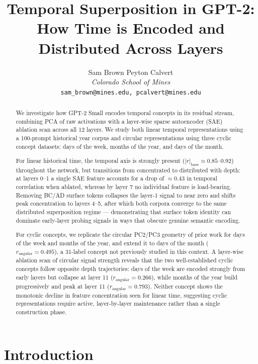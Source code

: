 \documentclass[11pt]{article}
\title{\textbf{Temporal Superposition in GPT-2: \\
How Time is Encoded and \\
Distributed Across Layers}}
\author{
  Sam Brown \quad Peyton Calvert \\[0.5em]
  \textit{Colorado School of Mines} \\
  \texttt{sam\_brown@mines.edu, pcalvert@mines.edu}
}
\date{}
\begin{document}

\maketitle

\begin{abstract}
We investigate how GPT-2 Small encodes temporal concepts in its residual stream,
combining PCA of raw activations with a layer-wise sparse autoencoder (SAE)
ablation scan across all 12 layers. We study both linear temporal representations
using a 100-prompt historical year corpus and circular representations using
three cyclic concept datasets: days of the week, months of the year, and days
of the month.

For linear historical time, the temporal axis is strongly present
($|r|_{\text{base}} \approx 0.85$--$0.92$) throughout the network, but transitions
from concentrated to distributed with depth: at layers 0--1 a single SAE feature
accounts for a drop of $\approx 0.43$ in temporal correlation when ablated, whereas
by layer 7 no individual feature is load-bearing. Removing BC/AD surface tokens
collapses the layer-1 signal to near zero and shifts peak concentration to layers
4--5, after which both corpora converge to the same distributed superposition regime
--- demonstrating that surface token identity can dominate early-layer probing signals
in ways that obscure genuine semantic encoding.

For cyclic concepts, we replicate the circular PC2/PC3 geometry of prior work for
days of the week and months of the year, and extend it to days of the month
($r_{\text{angular}} = 0.495$), a 31-label concept not previously studied in this
context. A layer-wise ablation scan of circular signal strength reveals that the two
well-established cyclic concepts follow opposite depth trajectories: days of the week
are encoded strongly from early layers but collapse at layer 11
($r_{\text{angular}} = 0.266$), while months of the year build progressively and
peak at layer 11 ($r_{\text{angular}} = 0.793$). Neither concept shows the monotonic
decline in feature concentration seen for linear time, suggesting cyclic representations
require active, layer-by-layer maintenance rather than a single construction phase.
\end{abstract}

\section{Introduction}
\end{document}
